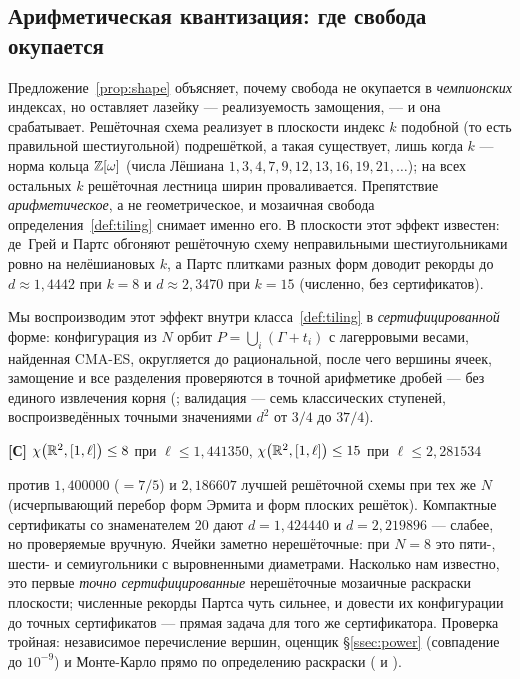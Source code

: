 \subsection{Арифметическая квантизация: где свобода окупается}
\label{ssec:quant}

Предложение~\ref{prop:shape} объясняет, почему свобода не окупается в
\emph{чемпионских} индексах, но оставляет лазейку --- реализуемость
замощения, --- и она срабатывает. Решёточная схема реализует в плоскости
индекс $k$ подобной (то есть правильной шестиугольной) подрешёткой, а такая
существует, лишь когда $k$ --- норма кольца $\mathbb{Z}[\omega]$ (числа Лёшиана
$1,3,4,7,9,12,13,16,19,21,\dots$); на всех остальных $k$ решёточная лестница
ширин проваливается. Препятствие \emph{арифметическое}, а не геометрическое,
и мозаичная свобода определения~\ref{def:tiling} снимает именно его. В
плоскости этот эффект известен: де~Грей и Партс \cite{deGreyParts} обгоняют
решёточную схему неправильными шестиугольниками ровно на нелёшиановых $k$, а
Партс \cite{Parts2023} плитками разных форм доводит рекорды до
$d\approx1{,}4442$ при $k=8$ и $d\approx2{,}3470$ при $k=15$ (численно, без
сертификатов).

Мы воспроизводим этот эффект внутри класса~\ref{def:tiling} в
\emph{сертифицированной} форме: конфигурация из $N$ орбит
$P=\bigcup_i(\Gamma+t_i)$ с лагерровыми весами, найденная CMA-ES, округляется
до рациональной, после чего вершины ячеек, замощение и все разделения
проверяются в точной арифметике дробей --- без единого извлечения корня
(; валидация ---
семь классических ступеней,
воспроизведённых точными значениями $d^2$ от $3/4$ до $37/4$).

\begin{keybox}
\textbf{[С]}\quad
$\chi\bigl(\mathbb{R}^2,[1,\ell]\bigr)\le8$ при $\ell\le1{,}441350$,\qquad
$\chi\bigl(\mathbb{R}^2,[1,\ell]\bigr)\le15$ при $\ell\le2{,}281534$
\end{keybox}

\noindent против $1{,}400000$ ($=7/5$) и $2{,}186607$ лучшей решёточной схемы
при тех же $N$ (исчерпывающий перебор форм Эрмита и форм плоских решёток).
Компактные сертификаты со знаменателем $20$ дают $d=1{,}424440$ и
$d=2{,}219896$ --- слабее, но проверяемые вручную. Ячейки заметно
нерешёточные: при $N=8$ это пяти-, шести- и семиугольники с выровненными
диаметрами. Насколько нам известно, это первые \emph{точно
сертифицированные} нерешёточные мозаичные раскраски плоскости; численные
рекорды Партса чуть сильнее, и довести их конфигурации до точных
сертификатов --- прямая задача для того же сертификатора. Проверка тройная:
независимое перечисление вершин, оценщик \S\ref{ssec:power} (совпадение до
$10^{-9}$) и Монте-Карло прямо по определению раскраски
( и
).

